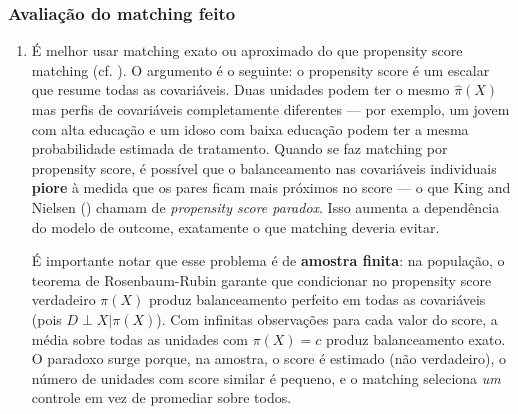 \documentclass[
]{article}
\begin{document}
\subsubsection{Avaliação do matching feito}\label{avaliauxe7uxe3o-do-matching-feito}

\begin{enumerate}
\def\labelenumi{\arabic{enumi}.}
\item
  É melhor usar matching exato ou aproximado do que propensity score matching (cf. ). O argumento é o seguinte: o propensity score é um escalar que resume todas as covariáveis. Duas unidades podem ter o mesmo \(\hat{\pi}(X)\) mas perfis de covariáveis completamente diferentes --- por exemplo, um jovem com alta educação e um idoso com baixa educação podem ter a mesma probabilidade estimada de tratamento. Quando se faz matching por propensity score, é possível que o balanceamento nas covariáveis individuais \textbf{piore} à medida que os pares ficam mais próximos no score --- o que King and Nielsen () chamam de \emph{propensity score paradox}. Isso aumenta a dependência do modelo de outcome, exatamente o que matching deveria evitar.

  É importante notar que esse problema é de \textbf{amostra finita}: na população, o teorema de Rosenbaum-Rubin garante que condicionar no propensity score verdadeiro \(\pi(X)\) produz balanceamento perfeito em todas as covariáveis (pois \(D \perp X | \pi(X)\)). Com infinitas observações para cada valor do score, a média sobre todas as unidades com \(\pi(X) = c\) produz balanceamento exato. O paradoxo surge porque, na amostra, o score é estimado (não verdadeiro), o número de unidades com score similar é pequeno, e o matching seleciona \emph{um} controle em vez de promediar sobre todos.


\end{enumerate}
\end{document}
